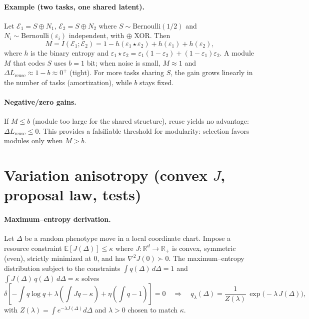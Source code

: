 \documentclass[11pt,a4paper]{article}
\begin{document}
\paragraph{Example (two tasks, one shared latent).}
Let $\mathcal{E}_1=S\oplus N_1$, $\mathcal{E}_2=S\oplus N_2$ where $S\sim\mathrm{Bernoulli}(1/2)$ and $N_i\sim\mathrm{Bernoulli}(\varepsilon_i)$ independent, with $\oplus$ XOR. Then
\[
M= I(\mathcal{E}_1;\mathcal{E}_2)=1 - h(\varepsilon_1\star\varepsilon_2) + h(\varepsilon_1) + h(\varepsilon_2),
\]
where $h$ is the binary entropy and $\varepsilon_1\star\varepsilon_2=\varepsilon_1(1-\varepsilon_2)+(1-\varepsilon_1)\varepsilon_2$. A module $M$ that codes $S$ uses $b=1$ bit; when noise is small, $M\approx 1$ and $\Delta L_{\text{reuse}}\approx 1-b\approx 0^+$ (tight). For more tasks sharing $S$, the gain grows linearly in the number of tasks (amortization), while $b$ stays fixed.

\paragraph{Negative/zero gains.}
If $M\le b$ (module too large for the shared structure), reuse yields no advantage: $\Delta L_{\text{reuse}}\le 0$. This provides a falsifiable threshold for modularity: selection favors modules only when $M>b$.

\section{Variation anisotropy (convex $J$, proposal law, tests)}
\label{app:anisotropy}

\paragraph{Maximum–entropy derivation.}
Let $\Delta$ be a random phenotype move in a local coordinate chart. Impose a resource constraint $\mathbb{E}[J(\Delta)]\le \kappa$ where $J:\mathbb{R}^d\to\mathbb{R}_+$ is convex, symmetric (even), strictly minimized at $0$, and has $\nabla^2 J(0)\succ 0$. The maximum–entropy distribution subject to the constraints $\int q(\Delta)\,d\Delta=1$ and $\int J(\Delta)\,q(\Delta)\,d\Delta=\kappa$ solves
\[
\delta\!\left[ -\int q\log q + \lambda\!\left(\int Jq - \kappa\right) + \eta\!\left(\int q - 1\right)\right]=0
\quad\Longrightarrow\quad
q_\lambda(\Delta)=\frac{1}{Z(\lambda)}\,\exp\!\big(-\lambda\,J(\Delta)\big),
\]
with $Z(\lambda)=\int e^{-\lambda J(\Delta)}d\Delta$ and $\lambda>0$ chosen to match $\kappa$.
\end{document}
